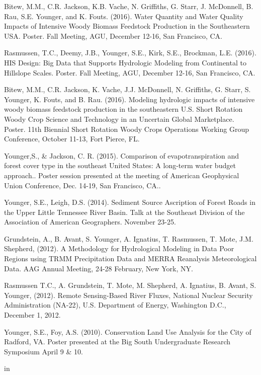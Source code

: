 \documentclass[10pt,letterpaper]{article}
\begin{document}
\begin{hangparas}{.25in}{1}
	Bitew, M.M., C.R. Jackson, K.B. Vache, N. Griffiths, G. Starr, J. McDonnell, B. Rau, S.E. Younger, and K. Fouts. (2016). Water Quantity and Water Quality Impacts of Intensive Woody Biomass Feedstock Production in the Southeastern USA. Poster. Fall Meeting, AGU, December 12-16, San Francisco, CA. 
	
	Rasmussen, T.C., Deemy, J.B., Younger, S.E., Kirk, S.E., Brockman, L.E. (2016). HIS Design: Big Data that Supports Hydrologic Modeling from Continental to Hillslope Scales. Poster. Fall Meeting, AGU, December 12-16, San Francisco, CA. 
	
	Bitew, M.M., C.R. Jackson, K. Vache, J.J. McDonnell, N. Griffiths, G. Starr, S. Younger, K. Fouts, and B. Rau. (2016). Modeling hydrologic impacts of intensive woody biomass feedstock production in the southeastern U.S. Short Rotation Woody Crop Science and Technology in an Uncertain Global Marketplace. Poster. 11th Biennial Short Rotation Woody Crops Operations Working Group Conference, October 11-13, Fort Pierce, FL.
	
	Younger,S., \& Jackson, C. R. (2015). Comparison of evapotranspiration and forest cover type in the southeast United States: A long-term water budget approach.. Poster session presented at the meeting of American Geophysical Union Conference, Dec. 14-19, San Francisco, CA..
	
	Younger, S.E., Leigh, D.S. (2014). Sediment Source Ascription of Forest Roads in the Upper Little Tennessee River Basin. Talk at the Southeast Division of the Association of American Geographers. November 23-25.
	
	Grundstein, A., B. Avant, S. Younger, A. Ignatius, T. Rasmussen, T. Mote, J.M. Shepherd, (2012). A Methodology for Hydrological Modeling in Data Poor Regions using TRMM Precipitation Data and MERRA Reanalysis Meteorological Data. AAG Annual Meeting, 24-28 February, New York, NY.
	
	Rasmussen T.C., A. Grundstein, T. Mote, M. Shepherd, A. Ignatius, B. Avant, S. Younger, (2012). Remote Sensing-Based River Fluxes, National Nuclear Security Administration (NA-22), U.S. Department of Energy, Washington D.C., December 1, 2012.
	
	Younger, S.E., Foy, A.S. (2010). Conservation Land Use Analysis for the City of Radford, VA. Poster presented at the Big South Undergraduate Research Symposium April 9 \& 10.
	
\end{hangparas}

 in
\end{document}

